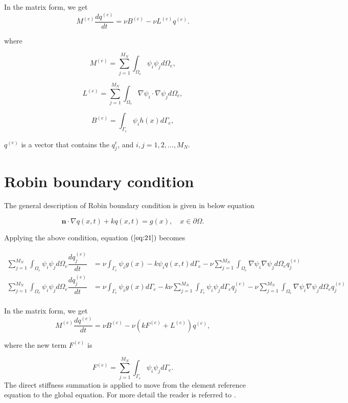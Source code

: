 \documentclass[11pt,a4paper]{article}
\begin{document}
	    \noindent In the matrix form, we get 
	    \begin{equation}
		    M^{(e)}\dfrac{dq^{(e)}}{dt} = \nu B^{(e)} - \nu L^{(e)}q^{(e)}.
		\end{equation}
	
	where
	
	$$M^{(e)} = \sum_{j=1}^{M_N}\int_{\Omega_e}\psi_i\psi_jd{\Omega_e},$$
	
	$$L^{(e)} = \sum_{j=1}^{M_N}\int_{\Omega_e}\nabla\psi_i\cdot\nabla \psi_j d{\Omega_e},$$
	
	$$B^{(e)} = \int_{\Gamma_e}\psi_ih(x)d{\Gamma_e},$$
	
	$q^{(e)}$ is a vector that contains the $q_j^{e}$, and $i,j = 1,2,\ldots,M_N$.
	\section{Robin boundary condition}
	    
	    The general description of Robin boundary condition is given in below equation
	    
		\begin{equation*}
			\label{eq:4}
			\mathbf{n}\cdot\nabla q(x,t) + k q(x,t)  = g(x), \quad x\in \partial \Omega. 
		\end{equation*}
		
		\noindent Applying the above condition, equation $(\ref{eq:21})$ becomes
		
		\begin{align*}
		    \sum_{j=1}^{M_N}\int_{\Omega_e}\psi_i\psi_jd{\Omega_e}\dfrac{d q_j^{(e)}}{dt}& = \nu\int_{\Gamma_e}\psi_ig(x) - k\psi_iq(x,t)d\Gamma_e- \nu\sum_{j=1}^{M_N}\int_{\Omega_e}\nabla\psi_i\nabla\psi_jd{\Omega_e}q_j^{(e)}\\[0.3cm]
		    \sum_{j=1}^{M_N}\int_{\Omega_e}\psi_i\psi_jd{\Omega_e}\dfrac{d q_j^{(e)}}{dt}& = \nu\int_{\Gamma_e}\psi_i g(x)d\Gamma_e - k\nu\sum_{j=1}^{M_N}\int_{\Gamma_e}\psi_i\psi_jd\Gamma_eq_j^{(e)} - \nu\sum_{j=1}^{M_N}\int_{\Omega_e}\nabla\psi_i\nabla\psi_jd{\Omega_e}q_j^{(e)}\\
		\end{align*}
		
		In the matrix form, we get 
		\begin{equation}
		    M^{(e)}\dfrac{dq^{(e)}}{dt} = \nu B^{(e)} - \nu\left(kF^{(e)} + L^{(e)}\right)q^{(e)},
		\end{equation}
		
	where the new term $F^{(e)}$ is 
	
	$$F^{(e)} = \sum_{j=1}^{M_N}\int_{\Gamma_e}\psi_i\psi_jd\Gamma_e.$$
	 The direct stiffness summation is applied to move from the element reference equation to the global equation. For more detail the reader is referred to \cite{giraldo2020introduction}.
	 
	 
    
\end{document}
